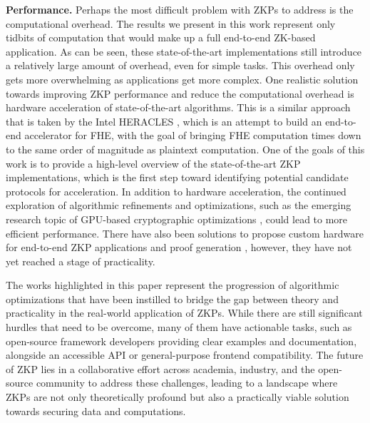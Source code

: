 \textbf{Performance.} Perhaps the most difficult problem with ZKPs to address is the computational overhead. The results we present in this work represent only tidbits of computation that would make up a full end-to-end ZK-based application. As can be seen, these state-of-the-art implementations still introduce a relatively large amount of overhead, even for simple tasks. This overhead only gets more overwhelming as applications get more complex. One realistic solution towards improving ZKP performance and reduce the computational overhead is hardware acceleration of state-of-the-art algorithms. This is a similar approach that is taken by the Intel HERACLES \cite{cammarota2022intel}, which is an attempt to build an end-to-end accelerator for FHE, with the goal of bringing FHE computation times down to the same order of magnitude as plaintext computation. One of the goals of this work is to provide a high-level overview of the state-of-the-art ZKP implementations, which is the first step toward identifying potential candidate protocols for acceleration. In addition to hardware acceleration, the continued exploration of algorithmic refinements and optimizations, such as the emerging research topic of GPU-based cryptographic optimizations \cite{lu2022cuzk, ma2023gzkp}, could lead to more efficient performance. There have also been solutions to propose custom hardware for end-to-end ZKP applications \cite{ahmed2024amaze, sheybani2025gotta} and proof generation \cite{samardzic2024accelerating, daftardar2024szkp}, however, they have not yet reached a stage of practicality.

The works highlighted in this paper represent the progression of algorithmic optimizations that have been instilled to bridge the gap between theory and practicality in the real-world application of ZKPs. While there are still significant hurdles that need to be overcome, many of them have actionable tasks, such as open-source framework developers providing clear examples and documentation, alongside an accessible API or general-purpose frontend compatibility. The future of ZKP lies in a collaborative effort across academia, industry, and the open-source community to address these challenges, leading to a landscape where ZKPs are not only theoretically profound but also a practically viable solution towards securing data and computations.

